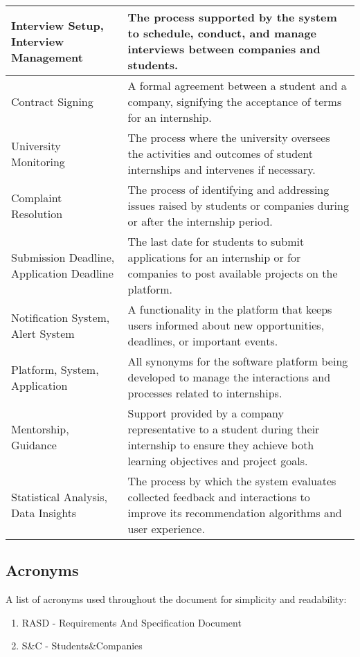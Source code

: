 \begin{longtable}{|p{}|p{}|}
    \hline
    Interview Setup, Interview Management & The process supported by the system to schedule, conduct, and manage interviews between companies and students. \\
    \hline
    Contract Signing & A formal agreement between a student and a company, signifying the acceptance of terms for an internship. \\
    \hline
    University Monitoring & The process where the university oversees the activities and outcomes of student internships and intervenes if necessary. \\
    \hline
    Complaint Resolution & The process of identifying and addressing issues raised by students or companies during or after the internship period. \\
    \hline
    Submission Deadline, Application Deadline & The last date for students to submit applications for an internship or for companies to post available projects on the platform. \\
    \hline
    Notification System, Alert System & A functionality in the platform that keeps users informed about new opportunities, deadlines, or important events. \\
    \hline
    Platform, System, Application & All synonyms for the software platform being developed to manage the interactions and processes related to internships. \\
    \hline
    Mentorship, Guidance & Support provided by a company representative to a student during their internship to ensure they achieve both learning objectives and project goals. \\
    \hline
    Statistical Analysis, Data Insights & The process by which the system evaluates collected feedback and interactions to improve its recommendation algorithms and user experience. \\
    \hline
    
\end{longtable}

\subsection{Acronyms}

A list of acronyms used throughout the document for simplicity and readability:

\begin{enumerate}
    \item RASD - Requirements And Specification Document
    \item S\&C - Students\&Companies
\end{enumerate}

